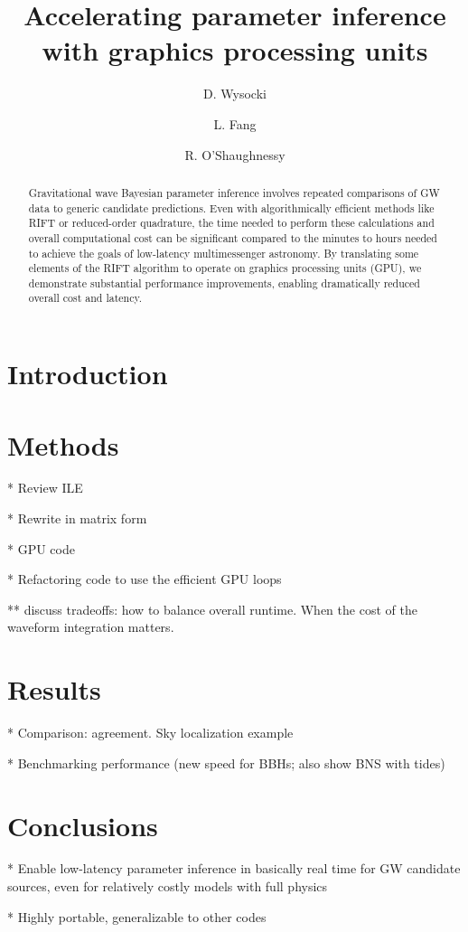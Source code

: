 \documentclass[onecolumn,prd,nofootinbib]{revtex4}
\begin{document}
\title{Accelerating parameter inference with graphics processing units}
\author{D. Wysocki}
\author{L. Fang}
\author{R. O'Shaughnessy}
\begin{abstract}
Gravitational wave Bayesian parameter inference involves repeated comparisons of GW data to generic candidate predictions.
Even with algorithmically efficient methods like RIFT or reduced-order quadrature, the time needed to perform these
calculations and overall computational cost can be significant compared to the minutes to hours needed to achieve the
goals of low-latency multimessenger astronomy.  By translating some elements of the RIFT algorithm to operate on
graphics processing units (GPU), we demonstrate substantial performance improvements, enabling dramatically reduced
overall cost and latency. 
\end{abstract}
\maketitle

\section{Introduction}

\section{Methods}

* Review ILE

* Rewrite in matrix form

* GPU code

* Refactoring code to use the efficient GPU loops

** discuss tradeoffs: how to balance overall runtime.  When the cost of the waveform integration matters.

\section{Results}

* Comparison: agreement.  Sky localization example

* Benchmarking performance (new speed for BBHs; also show BNS with tides)



\section{Conclusions}

* Enable low-latency parameter inference in basically real time for GW candidate sources, even for relatively costly
models with full physics

* Highly portable, generalizable to other codes


\end{document}
